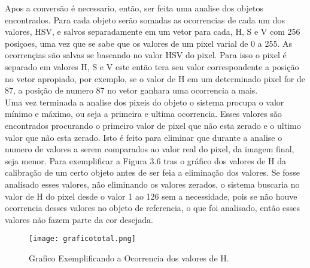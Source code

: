 Apos a conversão é necessario, então, ser feita uma analise dos objetos encontrados. Para cada objeto serão somadas as ocorrencias de cada um dos valores, HSV, e salvos separadamente em um vetor para cada, H, S e V com 256 posiçoes, uma vez que se sabe que os valores de um pixel varial de 0 a 255. As ocorrençias são salvas se baseando no valor HSV do pixel. Para isso o pixel é separado em valores H, S e V este então tera seu valor correspondente a posição no vetor apropiado, por exemplo, se o valor de H em um determinado pixel for de 87, a posição de numero 87 no vetor ganhara uma ocorrencia a mais.\\
%	        
%		     	
%		     		
%	        
	        
        
Uma vez terminada a analise dos pixeis do objeto o sistema procupa o valor mínimo e máximo, ou seja a primeira e ultima ocorrencia. Esses valores são encontrados procurando o primeiro valor de pixel que não esta zerado e o ultimo valor que não esta zerado. Isto é feito para eliminar que durante a analise o numero de valores a serem comparados ao valor real do pixel, da imagem final, seja menor. Para exemplificar a Figura 3.6 tras o gráfico dos valores de H da calibração de um certo objeto antes de ser feia a eliminação dos valores. Se fosse analisado esses valores, não eliminando os valores zerados, o sistema buscaria no valor de H do pixel desde o valor 1 ao 126 sem a necessidade, pois se não houve ocorrencia desses valores no objeto de referencia, o que foi analisado, então esses valores não fazem parte da cor desejada.

\begin{figure}[!h]
	\centering
	\texttt{[image: graficototal.png]}
	\caption{Grafico Exemplificando a Ocorrencia dos valores de H.}
	\label{Grafico Exemplo}
\end{figure}


